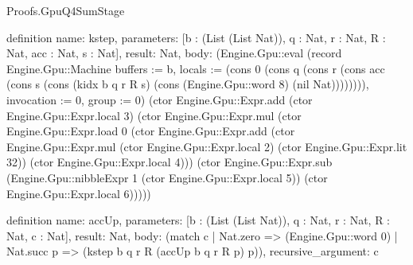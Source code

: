 \begin{lexlean}{Proofs.GpuQ4SumStage}
\begin{semanticmodule}
definition{
  name: kstep,
  parameters: [b : (List (List Nat)), q : Nat, r : Nat, R : Nat, acc : Nat, s : Nat],
  result: Nat,
  body: (Engine.Gpu::eval (record Engine.Gpu::Machine {buffers := b, locals := (cons 0 (cons q (cons r (cons acc (cons s (cons (kidx b q r R s) (cons (Engine.Gpu::word 8) (nil Nat)))))))), invocation := 0, group := 0}) (ctor Engine.Gpu::Expr.add (ctor Engine.Gpu::Expr.local 3) (ctor Engine.Gpu::Expr.mul (ctor Engine.Gpu::Expr.load 0 (ctor Engine.Gpu::Expr.add (ctor Engine.Gpu::Expr.mul (ctor Engine.Gpu::Expr.local 2) (ctor Engine.Gpu::Expr.lit 32)) (ctor Engine.Gpu::Expr.local 4))) (ctor Engine.Gpu::Expr.sub (Engine.Gpu::nibbleExpr 1 (ctor Engine.Gpu::Expr.local 5)) (ctor Engine.Gpu::Expr.local 6)))))
}

definition{
  name: accUp,
  parameters: [b : (List (List Nat)), q : Nat, r : Nat, R : Nat, c : Nat],
  result: Nat,
  body: (match c
    | Nat.zero => (Engine.Gpu::word 0)
    | Nat.succ p => (kstep b q r R (accUp b q r R p) p)),
  recursive_argument: c
}


\end{semanticmodule}
\end{lexlean}
